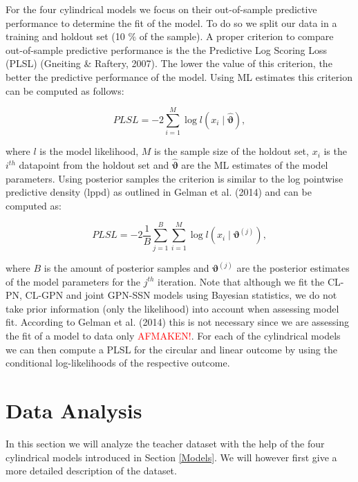 \documentclass[11pt,]{article}
\begin{document}
For the four cylindrical models we focus on their out-of-sample
predictive performance to determine the fit of the model. To do so we
split our data in a training and holdout set (10 \(\%\) of the sample).
A proper criterion to compare out-of-sample predictive performance is
the the Predictive Log Scoring Loss (PLSL) (Gneiting \& Raftery, 2007).
The lower the value of this criterion, the better the predictive
performance of the model. Using ML estimates this criterion can be
computed as follows:

\begin{equation}\label{PLSLML}
PLSL = -2 \sum_{i = 1}^{M}\log l(x_i \mid \hat{\boldsymbol{\vartheta}}),
\end{equation}

where \(l\) is the model likelihood, \(M\) is the sample size of the
holdout set, \(x_i\) is the \(i^{th}\) datapoint from the holdout set
and \(\hat{\boldsymbol{\vartheta}}\) are the ML estimates of the model
parameters. Using posterior samples the criterion is similar to the log
pointwise predictive density (lppd) as outlined in Gelman et al. (2014)
and can be computed as:

\begin{equation}\label{PLSLBayes}
PLSL = -2 \frac{1}{B} \sum_{j = 1}^{B}\sum_{i = 1}^{M} \log l(x_i \mid \boldsymbol{\vartheta}^{(j)}),
\end{equation}

where \(B\) is the amount of posterior samples and
\(\boldsymbol{\vartheta}^{(j)}\) are the posterior estimates of the
model parameters for the \(j^{th}\) iteration. Note that although we fit
the CL-PN, CL-GPN and joint GPN-SSN models using Bayesian statistics, we
do not take prior information (only the likelihood) into account when
assessing model fit. According to Gelman et al. (2014) this is not
necessary since we are assessing the fit of a model to data only
\textcolor{red}{AFMAKEN!}. For each of the cylindrical models we can
then compute a PLSL for the circular and linear outcome by using the
conditional log-likelihoods of the respective outcome.

\section{Data Analysis}\label{DataAnalysis}

In this section we will analyze the teacher dataset with the help of the
four cylindrical models introduced in Section \ref{Models}. We will
however first give a more detailed description of the dataset.
\end{document}
